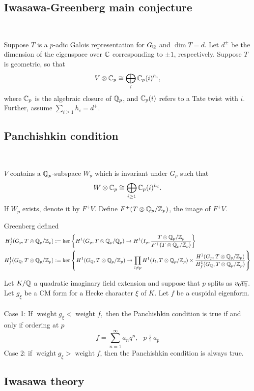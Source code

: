 \documentclass[12pt,amsfont]{amsart}
\begin{document}
\subsection{Iwasawa-Greenberg main conjecture }
{\ }

Suppose $T$ is a $p$-adic Galois representation for $G_{\mathbb Q}$ and $\dim T = d$. Let $d^\pm$ be the dimension of the eigenspace over ${\mathbb C}$ corresponding to $\pm 1$, respectively. Suppose $T$ is geometric, so that
\[V \otimes {\mathbb C}_p \cong \bigoplus_i {\mathbb C}_p(i)^{h_i},\]
where ${\mathbb C}_p$ is the algebraic closure of ${\mathbb Q}_p$, and ${\mathbb C}_p(i)$ refers to a Tate twist with $i$. Further, assume $ \sum_{i\geq 1} h_i = d^+$. 

\subsection{Panchishkin condition }
{\ }

$V$ contains a ${\mathbb Q}_p$-subspace $W_p$ which is invariant under $G_p$ such that
\[W \otimes {\mathbb C}_p \cong \bigoplus_{i \geq 1} {\mathbb C}_p(i)^{h_i}.\]
If $W_p$ exists, denote it by $F^+ V$. Define $F^+(T \otimes {\mathbb Q}_p/{\mathbb Z}_p)$, the image of $F^+ V$. 

Greenberg defined
\begin{align*}
H_f^1(G_p, T \otimes {\mathbb Q}_p/{\mathbb Z}_p) &:= \ker \left \{H^1(G_p, T \otimes {\mathbb Q}_p/{\mathbb Q}_p) \rightarrow H^1(I_p, \frac{T \otimes {\mathbb Q}_p/{\mathbb Z}_p}{F^+ (T \otimes {\mathbb Q}_p/{\mathbb Z}_p)} \right \}\\
H_f^1(G_{\mathbb Q}, T \otimes {\mathbb Q}_p/{\mathbb Z}_p) &:= \ker \left \{ H^1(G_{\mathbb Q}, T \otimes {\mathbb Q}_p/{\mathbb Z}_p) \rightarrow \prod_{l \ne p} H^1(I_l, T \otimes {\mathbb Q}_p/{\mathbb Z}_p) \times \frac{H^1(G_p, T \otimes {\mathbb Q}_p/{\mathbb Z}_p)}{H_f^1(G_{\mathbb Q}, T \otimes {\mathbb Q}_p/{\mathbb Z}_p)} \right \}
\end{align*}

\begin{xmp} Let $K/{\mathbb Q}$ a quadratic imaginary field extension and suppose that $p$ splits as $v_0 \overline{v_0}$. Let $g_\xi$ be a CM form for a Hecke character $\xi$ of $K$. Let $f$ be a cuspidal eigenform. \\ \\
Case 1: If $\operatorname{weight} g_\xi < \operatorname{weight} f,$ then the Panchishkin condition is true if and only if ordering at $p$ 
\[f = \sum_{n=1}^\infty a_n q^n, \text{ } p \nmid a_p\]
Case 2: if $\operatorname{weight} g_\xi > \operatorname{weight} f$, then the Panchishkin condition is always true.
\end{xmp}

\subsection{Iwasawa theory}
{\ }
\end{document}
